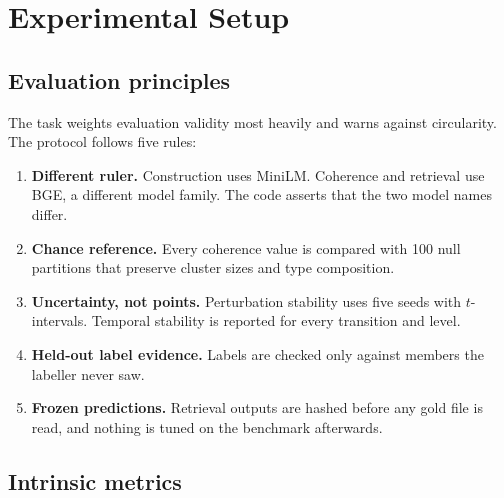 \documentclass[11pt,a4paper]{article}
\theoremstyle{remark}
\begin{document}
\section{Experimental Setup}
\label{sec:setup}

\subsection{Evaluation principles}

The task weights evaluation validity most heavily and warns against circularity. The
protocol follows five rules:

\begin{keybox}
\begin{enumerate}[leftmargin=*]
  \item \textbf{Different ruler.} Construction uses MiniLM. Coherence and retrieval use BGE,
        a different model family. The code asserts that the two model names differ.
  \item \textbf{Chance reference.} Every coherence value is compared with 100 null
        partitions that preserve cluster sizes and type composition.
  \item \textbf{Uncertainty, not points.} Perturbation stability uses five seeds with
        $t$-intervals. Temporal stability is reported for every transition and level.
  \item \textbf{Held-out label evidence.} Labels are checked only against members the
        labeller never saw.
  \item \textbf{Frozen predictions.} Retrieval outputs are hashed before any gold file is
        read, and nothing is tuned on the benchmark afterwards.
\end{enumerate}
\end{keybox}

\subsection{Intrinsic metrics}
\end{document}
